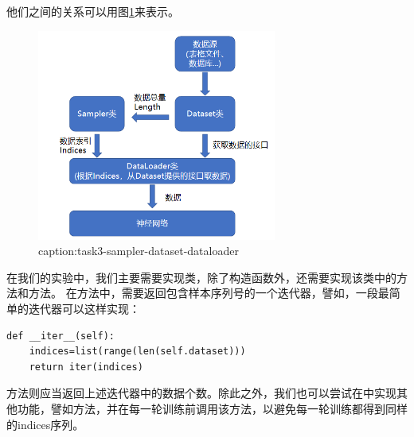 他们之间的关系可以用图\ref{fig:task3-sampler-dataset-dataloader}来表示。
\begin{figure}[htbp]
	\centering
	\includegraphics[width=0.7\textwidth]{figures/task3-sampler-dataset-dataloader.png}
	\caption{caption:task3-sampler-dataset-dataloader}
	\label{fig:task3-sampler-dataset-dataloader}
\end{figure}

在我们的实验中，我们主要需要实现类，除了构造函数外，还需要实现该类中的方法和方法。
在方法中，需要返回包含样本序列号的一个迭代器，譬如，一段最简单的迭代器可以这样实现：
\begin{lstlisting}
def __iter__(self):
    indices=list(range(len(self.dataset)))
    return iter(indices)
\end{lstlisting}

方法则应当返回上述迭代器中的数据个数。除此之外，我们也可以尝试在中实现其他功能，譬如方法，并在每一轮训练前调用该方法，以避免每一轮训练都得到同样的indices序列。

